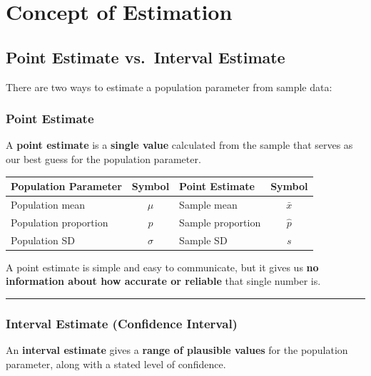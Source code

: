 \documentclass[
  12pt,
  letterpaper,
]{book}
\newcounter{none} %
\begin{document}

\chapter{Concept of Estimation}\label{concept-of-estimation}

\section{Point Estimate vs.~Interval
Estimate}\label{point-estimate-vs.-interval-estimate}

There are two ways to estimate a population parameter from sample data:

\subsection{Point Estimate}\label{point-estimate}

A \textbf{point estimate} is a \textbf{single value} calculated from the
sample that serves as our best guess for the population parameter.

{\def\LTcaptype{none} %
\begin{longtable}[]{@{}lclc@{}}
\toprule\noalign{}
Population Parameter & Symbol & Point Estimate & Symbol \\
\midrule\noalign{}
\endhead
\bottomrule\noalign{}
\endlastfoot
Population mean & \(\mu\) & Sample mean & \(\bar{x}\) \\
Population proportion & \(p\) & Sample proportion & \(\hat{p}\) \\
Population SD & \(\sigma\) & Sample SD & \(s\) \\
\end{longtable}
}

A point estimate is simple and easy to communicate, but it gives us
\textbf{no information about how accurate or reliable} that single
number is.

\begin{center}\rule{0.5\linewidth}{0.5pt}\end{center}

\subsection{Interval Estimate (Confidence
Interval)}\label{interval-estimate-confidence-interval}

An \textbf{interval estimate} gives a \textbf{range of plausible values}
for the population parameter, along with a stated level of confidence.
\end{document}
